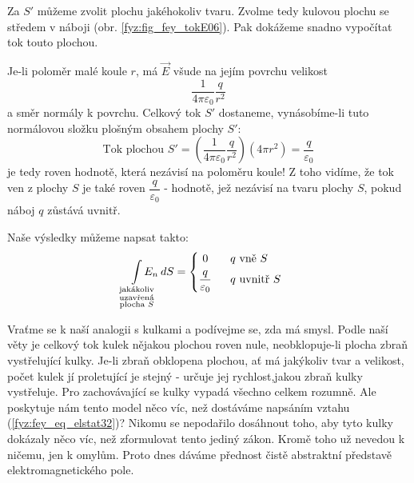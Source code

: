     Za \(S'\) můžeme zvolit plochu jakéhokoliv tvaru. Zvolme tedy kulovou plochu se středem v náboji 
    (obr. \ref{fyz:fig_fey_tokE06}). Pak dokážeme snadno vypočítat tok touto plochou. 
        
    Je-li poloměr malé koule \(r\), má \(\vec{E}\) všude na jejím povrchu velikost
    \begin{equation*}
      \frac{1}{4\pi\varepsilon_0}\frac{q}{r^2}
    \end{equation*}
    a směr normály k povrchu. Celkový tok \(S'\) dostaneme, vynásobíme-li tuto normálovou složku 
    plošným obsahem plochy \(S'\):
    \begin{equation} \label{fyz:fey_eq_elstat31}
      \text{Tok plochou } S' = \left(\frac{1}{4\pi\varepsilon_0}\frac{q}{r^2}\right)(4\pi r^2)  
                             = \frac{q}{\varepsilon_0}
    \end{equation}
    je tedy roven hodnotě, která nezávisí na poloměru koule! Z toho vidíme, že tok ven z plochy 
    \(S\) je také roven \(\dfrac{q}{\varepsilon_0}\) - hodnotě, jež nezávisí na tvaru plochy \(S\), 
    pokud náboj \(q\) zůstává uvnitř.
    
    Naše výsledky můžeme napsat takto:
    \begin{equation}\label{fyz:fey_eq_elstat32}
      \limitint_{\mathclap{\substack{\text{jakákoliv}\\\text{uzavřená}\\\text{plocha }S}}} E_n\dd{S} = 
        \begin{dcases*}
           0                       & \(q\) vně \(S\) \\
           \frac{q}{\varepsilon_0} & \(q\) uvnitř \(S\)
        \end{dcases*}          
    \end{equation} 
        
    Vraťme se k naší analogii s kulkami a podívejme se, zda má smysl. Podle naší věty je celkový tok 
    kulek nějakou plochou roven nule, neobklopuje-li plocha zbraň vystřelující kulky. Je-li zbraň 
    obklopena plochou, ať má jakýkoliv tvar a velikost, počet kulek jí proletující je stejný - 
    určuje jej rychlost,jakou zbraň kulky vystřeluje. Pro zachovávající se kulky vypadá všechno 
    celkem rozumně. Ale poskytuje nám tento model něco víc, než dostáváme napsáním vztahu 
    (\ref{fyz:fey_eq_elstat32})? Nikomu se nepodařilo dosáhnout toho, aby tyto kulky dokázaly něco 
    víc, než zformulovat tento jediný zákon. Kromě toho už nevedou k ničemu, jen k omylům. Proto 
    dnes dáváme přednost čistě abstraktní představě elektromagnetického pole.

